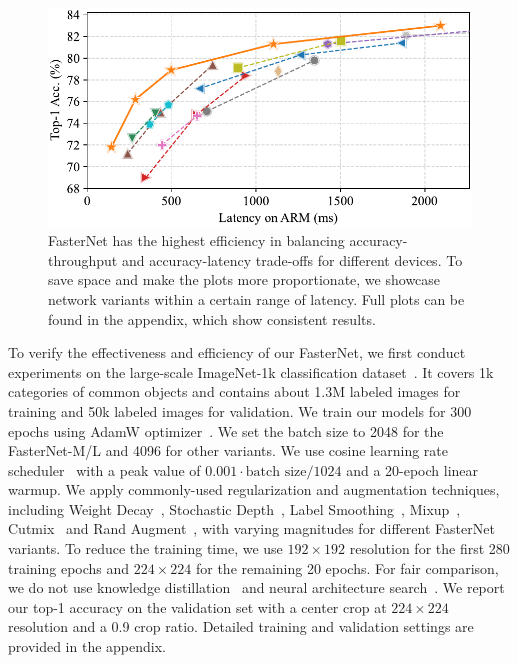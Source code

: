 \begin{figure}
    \includegraphics[width=1\linewidth]{figures/acc_latency_arm_st-cropped.pdf}
    
    \vspace{-0.15in}
    \caption{FasterNet has the highest efficiency in balancing accuracy-throughput and accuracy-latency trade-offs for different devices. To save space and make the plots more proportionate, we showcase network variants within a certain range of latency. Full plots can be found in the appendix, which show consistent results.}
    \label{fig:imageent}
    \vspace{-0.15in}
\end{figure}





To verify the effectiveness and efficiency of our FasterNet, we first conduct experiments on the large-scale ImageNet-1k classification dataset~\cite{russakovsky2015imagenet}. It covers 1k categories of common objects and contains about 1.3M labeled images for training and 50k labeled images for validation. We train our models for 300 epochs using AdamW optimizer~\cite{loshchilov2017decoupled}. We set the batch size to 2048 for the FasterNet-M/L and 4096 for other variants. We use cosine learning rate scheduler~\cite{loshchilov2016sgdr} with a peak value of $0.001\cdot\text{batch size}/1024$ and a 20-epoch linear warmup. We apply commonly-used regularization and augmentation techniques, including Weight Decay~\cite{krogh1991simple}, Stochastic Depth~\cite{huang2016deep}, Label Smoothing~\cite{szegedy2016rethinking}, Mixup~\cite{zhang2017mixup}, Cutmix~\cite{yun2019cutmix} and Rand Augment~\cite{cubuk2020randaugment}, with varying magnitudes for different FasterNet variants. To reduce the training time, we use $192 \times 192$ resolution for the first 280 training epochs and $224 \times 224$ for the remaining 20 epochs. For fair comparison, we do not use knowledge distillation~\cite{hinton2015distilling} and neural architecture search~\cite{zoph2016neural}. We report our top-1 accuracy on the validation set with a center crop at $224 \times 224$ resolution and a 0.9 crop ratio. Detailed training and validation settings are provided in the appendix.

